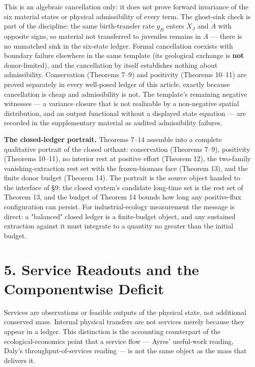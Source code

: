 \documentclass[11pt]{article}
\begin{document}
 This is an algebraic cancellation only: it does not prove forward invariance of the six material states or physical admissibility of every term. The ghost-sink check is part of the discipline: the same birth-transfer rate \(g_B\) enters \(\dot X_J\) and \(\dot A\) with opposite signs, so material not transferred to juveniles remains in \(A\) --- there is no unmatched sink in the six-state ledger. Formal cancellation coexists with boundary failure elsewhere in the same template (its geological exchange is \textbf{not} donor-limited), and the cancellation by itself establishes nothing about admissibility. Conservation (Theorems 7--9) and positivity (Theorems 10--11) are proved separately in every well-posed ledger of this article, exactly because cancellation is cheap and admissibility is not. The template's remaining negative witnesses --- a variance closure that is not realizable by a non-negative spatial distribution, and an output functional without a displayed state equation --- are recorded in the supplementary material as audited admissibility failures.

\textbf{The closed-ledger portrait.} Theorems 7--14 assemble into a complete qualitative portrait of the closed orthant: conservation (Theorems 7--9), positivity (Theorems 10--11), no interior rest at positive effort (Theorem 12), the two-family vanishing-extraction rest set with the frozen-biomass face (Theorem 13), and the finite donor budget (Theorem 14). The portrait is the source object handed to the interface of \S9: the closed system's candidate long-time set is the rest set of Theorem 13, and the budget of Theorem 14 bounds how long any positive-flux configuration can persist. For industrial-ecology measurement the message is direct: a "balanced" closed ledger is a finite-budget object, and any sustained extraction against it must integrate to a quantity no greater than the initial budget.

\vspace{0.8em}

\section*{5. Service Readouts and the Componentwise Deficit}\label{5-service-readouts-and-the-componentwise-deficit}

Services are observations or feasible outputs of the physical state, not additional conserved mass. Internal physical transfers are not services merely because they appear in a ledger. This distinction is the accounting counterpart of the ecological-economics point that a service flow --- Ayres' useful-work reading, Daly's throughput-of-services reading --- is not the same object as the mass that delivers it.
\end{document}

